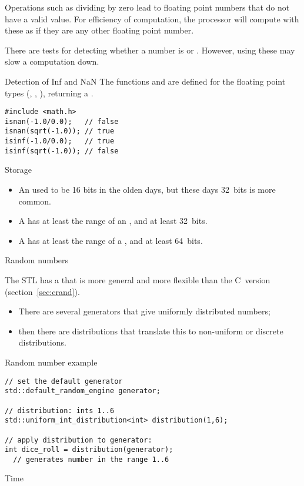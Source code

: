 Operations such as dividing by zero lead to floating point numbers
that do not have a valid value. For efficiency of computation, the
processor will compute with these as if they are any other floating
point number.

There are tests for detecting whether a number is  or
. However, using these may slow a computation down.

\begin{block}{Detection of Inf and NaN}
  The functions  and  are
  defined for the floating point types (, , ), returning a .
\begin{lstlisting}
#include <math.h>
isnan(-1.0/0.0);   // false
isnan(sqrt(-1.0)); // true
isinf(-1.0/0.0);   // true
isinf(sqrt(-1.0)); // false
\end{lstlisting}
\end{block}

 {Storage}

\begin{itemize}
\item An  used to be 16 bits in the olden days, but these days
  32~bits is more common.
\item A  has at least the range of an
  , and at least 32~bits.
\item A  has at least the
  range of a , and at least 64~bits.
\end{itemize}

 {Random numbers}
\label{sec:stl:random}

The \ac{STL} has a
that is more general and more flexible than the C~version (section~\ref{sec:crand}).
\begin{itemize}
\item There are several generators that give uniformly distributed
  numbers;
\item then there are distributions that translate this to non-uniform
  or discrete distributions.
\end{itemize}

\begin{block}{Random number example}
  \label{sl:stl:rand16}
\begin{lstlisting}
// set the default generator
std::default_random_engine generator;

// distribution: ints 1..6
std::uniform_int_distribution<int> distribution(1,6);

// apply distribution to generator:
int dice_roll = distribution(generator);
  // generates number in the range 1..6 
\end{lstlisting}
\end{block}

 {Time}

